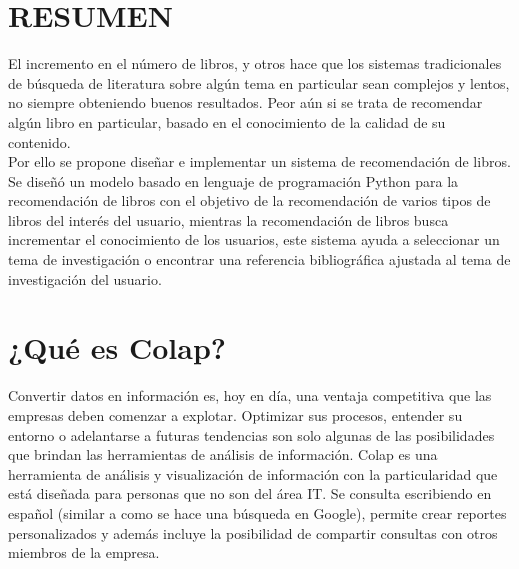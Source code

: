 \section{RESUMEN} 

El incremento en el número de libros, y otros hace que los sistemas tradicionales de búsqueda de literatura sobre algún tema en particular sean complejos y lentos, no siempre obteniendo buenos resultados. Peor aún si se trata de recomendar algún libro en particular, basado en el conocimiento de la calidad de su contenido. 
\\
Por ello se propone diseñar e implementar un sistema de recomendación de libros. Se diseñó un modelo basado en lenguaje de programación Python para la recomendación de libros con el objetivo de la recomendación de varios tipos de libros del interés del usuario, mientras la recomendación de libros busca incrementar el conocimiento de los usuarios, este sistema ayuda a seleccionar un tema de investigación o encontrar una referencia bibliográfica ajustada al tema de investigación del usuario. 


\section{¿Qué es Colap?} 
Convertir datos en información es, hoy en día, una ventaja competitiva que las empresas deben comenzar a explotar. Optimizar sus procesos, entender su entorno o adelantarse a futuras tendencias son solo algunas de las posibilidades que brindan las herramientas de análisis de información.
Colap es una herramienta de análisis y visualización de información con la particularidad que está diseñada para personas que no son del área IT. Se consulta escribiendo en español (similar a como se hace una búsqueda en Google), permite crear reportes personalizados y además incluye la posibilidad de compartir consultas con otros miembros de la empresa.

